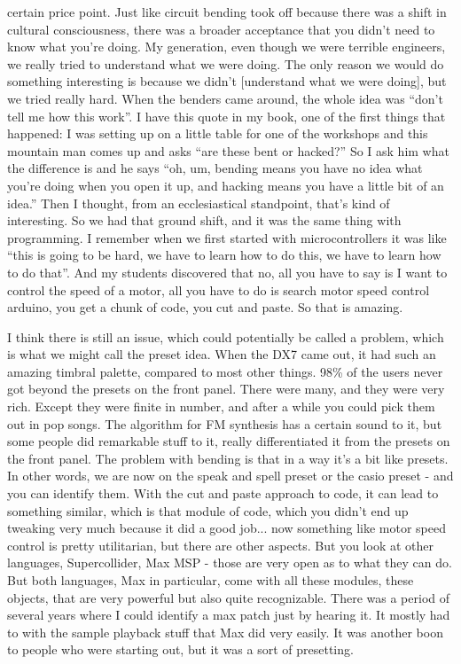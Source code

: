 certain price point. Just like circuit bending took off because there was a shift in cultural consciousness, there was a broader acceptance that you didn’t need to know what you’re doing. My generation, even though we were terrible engineers, we really tried to understand what we were doing. The only reason we would do something interesting is because we didn’t [understand what we were doing], but we tried really hard. When the benders came around, the whole idea was ``don’t tell me how this work''. I have this quote in my book, one of the first things that happened: I was setting up on a little table for one of the workshops and this mountain man comes up and asks ``are these bent or hacked?'' So I ask him what the difference is and he says ``oh, um, bending means you have no idea what you’re doing when you open it up, and hacking means you have a little bit of an idea.'' Then I thought, from an ecclesiastical standpoint, that’s kind of interesting. So we had that ground shift, and it was the same thing with programming. I remember when we first started with microcontrollers it was like ``this is going to be hard, we have to learn how to do this, we have to learn how to do that''. And my students discovered that no, all you have to say is I want to control the speed of a motor, all you have to do is search motor speed control arduino, you get a chunk of code, you cut and paste. So that is amazing.
					
I think there is still an issue, which could potentially be called a problem, which is what we might call the preset idea. When the DX7 came out, it had such an amazing timbral palette, compared to most other things. 98\% of the users never got beyond the presets on the front panel. There were many, and they were very rich. Except they were finite in number, and after a while you could pick them out in pop songs. The algorithm for FM synthesis has a certain sound to it, but some people did remarkable stuff to it, really differentiated it from the presets on the front panel. The problem with bending is that in a way it’s a bit like presets. In other words, we are now on the speak and spell preset or the casio preset - and you can identify them. With the cut and paste approach to code, it can lead to something similar, which is that module of code, which you didn’t end up tweaking very much because it did a good job... now something like motor speed control is pretty utilitarian, but there are other aspects. But you look at other languages, Supercollider, Max MSP - those are very open as to what they can do. But both languages, Max in particular, come with all these modules, these objects, that are very powerful but also quite recognizable. There was a period of several years where I could identify a max patch just by hearing it. It mostly had to with the sample playback stuff that Max did very easily. It was another boon to people who were starting out, but it was a sort of presetting.
					
